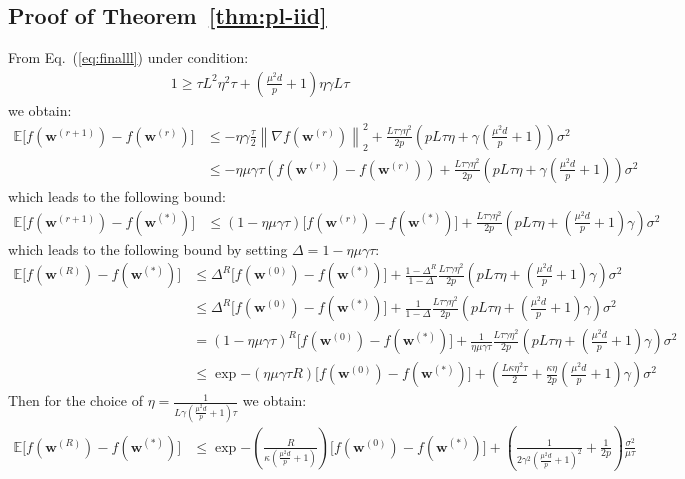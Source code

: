 \subsection{Proof of Theorem~\ref{thm:pl-iid}}
From Eq.~(\ref{eq:finalll}) under condition:
\begin{align}
       1\geq {\tau L^2\eta^2\tau}+{(\frac{\mu^2d}{p}+1)\eta\gamma L}{\tau} 
\end{align}
we obtain:
\begin{align}
         \mathbb{E}\Big[f({\boldsymbol{w}}^{(r+1)})-f({\boldsymbol{w}}^{(r)})\Big]&\leq -\eta\gamma\frac{\tau}{2}\left\|\nabla f({\boldsymbol{w}}^{(r)})\right\|_2^2+\frac{L\tau\gamma\eta^2 }{2p}\left(pL\tau\eta+\gamma(\frac{\mu^2d}{p}+1)\right)\sigma^2\nonumber\\
         &\leq -\eta\mu\gamma{\tau} \left(f({\boldsymbol{w}}^{(r)})-f({\boldsymbol{w}}^{(r)})\right)+\frac{L\tau\gamma\eta^2 }{2p}\left(pL\tau\eta+\gamma(\frac{\mu^2d}{p}+1)\right)\sigma^2 
\end{align}
which leads to the following bound:
\begin{align}
            \mathbb{E}\Big[f({\boldsymbol{w}}^{(r+1)})-f({\boldsymbol{w}}^{(*)})\Big]&\leq \left(1-\eta\mu\gamma{\tau}\right) \Big[f({\boldsymbol{w}}^{(r)})-f({\boldsymbol{w}}^{(*)})\Big]+\frac{L\tau\gamma\eta^2 }{2p}\left(pL\tau\eta+(\frac{\mu^2d}{p}+1)\gamma\right)\sigma^2
\end{align}
which leads to the following bound by setting $\Delta=1-\eta\mu\gamma{\tau}$:
\begin{align}
            \mathbb{E}\Big[f({\boldsymbol{w}}^{(R)})-f({\boldsymbol{w}}^{(*)})\Big]&\leq \Delta^R \Big[f({\boldsymbol{w}}^{(0)})-f({\boldsymbol{w}}^{(*)})\Big]+\frac{1-\Delta^R}{1-\Delta}\frac{L\tau\gamma\eta^2 }{2p}\left(pL\tau\eta+(\frac{\mu^2d}{p}+1)\gamma\right)\sigma^2\nonumber\\
            &\leq \Delta^R \Big[f({\boldsymbol{w}}^{(0)})-f({\boldsymbol{w}}^{(*)})\Big]+\frac{1}{1-\Delta}\frac{L\tau\gamma\eta^2 }{2p}\left(pL\tau\eta+(\frac{\mu^2d}{p}+1)\gamma\right)\sigma^2\nonumber\\
            &={\left(1-\eta\mu\gamma{\tau}\right)}^R \Big[f({\boldsymbol{w}}^{(0)})-f({\boldsymbol{w}}^{(*)})\Big]+\frac{1}{\eta\mu\gamma{\tau}}\frac{L\tau\gamma\eta^2 }{2p}\left(pL\tau\eta+(\frac{\mu^2d}{p}+1)\gamma\right)\sigma^2\nonumber\\
            &\leq \exp{-\left(\eta\mu\gamma{\tau} R\right)}\Big[f({\boldsymbol{w}}^{(0)})-f({\boldsymbol{w}}^{(*)})\Big]+\left(\frac{L\kappa\eta^2 \tau}{2}+\frac{\kappa\eta }{2p}(\frac{\mu^2d}{p}+1)\gamma\right)\sigma^2
\end{align}
Then for the choice of $\eta=\frac{1}{L\gamma (\frac{\mu^2d}{p}+1) \tau}$ we obtain:
\begin{align}
                \mathbb{E}\Big[f({\boldsymbol{w}}^{(R)})-f({\boldsymbol{w}}^{(*)})\Big]&\leq \exp{-\left(\frac{ R}{\kappa (\frac{\mu^2d}{p}+1)}\right)}\Big[f({\boldsymbol{w}}^{(0)})-f({\boldsymbol{w}}^{(*)})\Big]+\left(\frac{1}{2\gamma^2 {(\frac{\mu^2d}{p}+1)}^2 }+\frac{1}{2p}\right)\frac{\sigma^2}{\mu\tau}
\end{align}
